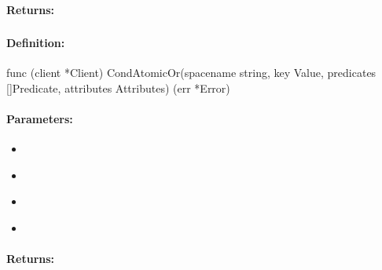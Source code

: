 \paragraph{Returns:}


\pagebreak
\subsubsection{}
\label{api:Go:CondAtomicOr}


\paragraph{Definition:}
\begin{gocode}
func (client *Client) CondAtomicOr(spacename string, key Value, predicates []Predicate, attributes Attributes) (err *Error)
\end{gocode}

\paragraph{Parameters:}
\begin{itemize}[noitemsep]
\item {}\\

\item {}\\

\item {}\\

\item {}\\

\end{itemize}

\paragraph{Returns:}


\pagebreak
\subsubsection{}
\label{api:Go:GroupAtomicOr}


